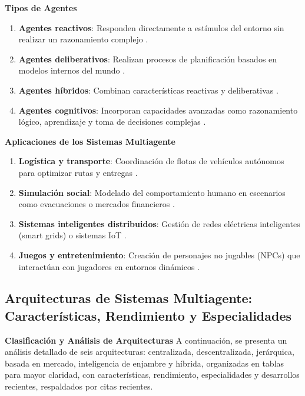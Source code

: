 \textbf{Tipos de Agentes}
\begin{enumerate}[leftmargin=*]
	\item \textbf{Agentes reactivos}: Responden directamente a estímulos del entorno sin realizar un razonamiento complejo \cite{ferber1999multi}.
	\item \textbf{Agentes deliberativos}: Realizan procesos de planificación basados en modelos internos del mundo \cite{russell2016artificial}.
	\item \textbf{Agentes híbridos}: Combinan características reactivas y deliberativas \cite{stone2000multiagent}.
	\item \textbf{Agentes cognitivos}: Incorporan capacidades avanzadas como razonamiento lógico, aprendizaje y toma de decisiones complejas \cite{wooldridge2009introduccion}.
\end{enumerate}

\textbf{Aplicaciones de los Sistemas Multiagente}
\begin{enumerate}[leftmargin=*]
	\item \textbf{Logística y transporte}: Coordinación de flotas de vehículos autónomos para optimizar rutas y entregas \cite{stone2000multiagent}.
	\item \textbf{Simulación social}: Modelado del comportamiento humano en escenarios como evacuaciones o mercados financieros \cite{panait2005cooperative}.
	\item \textbf{Sistemas inteligentes distribuidos}: Gestión de redes eléctricas inteligentes (smart grids) o sistemas IoT \cite{russell2016artificial}.
	\item \textbf{Juegos y entretenimiento}: Creación de personajes no jugables (NPCs) que interactúan con jugadores en entornos dinámicos \cite{ferber1999multi}.
\end{enumerate}

\subsection{Arquitecturas de Sistemas Multiagente: Características, Rendimiento y Especialidades}
	\textbf{Clasificación y Análisis de Arquitecturas}
	A continuación, se presenta un análisis detallado de seis arquitecturas: centralizada, descentralizada, jerárquica, basada en mercado, inteligencia de enjambre y híbrida, organizadas en tablas para mayor claridad, con características, rendimiento, especialidades y desarrollos recientes, respaldados por citas recientes.
	

